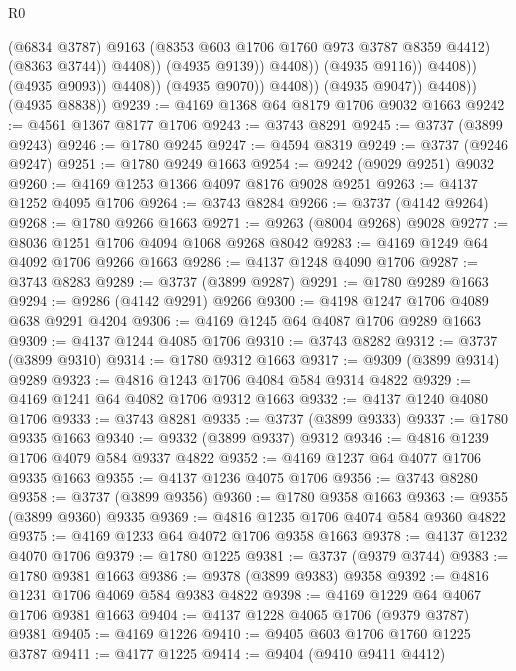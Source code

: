 \begin{lexlean}{R0}
\begin{coremodule}
                                          (@6834 @3787)
                                          @9163
                                          (@8353 @603 @1706 @1760 @973 @3787 @8359 @4412)
                                          (@8363 @3744))
                                        @4408))
                                    (@4935 @9139))
                                  @4408))
                              (@4935 @9116))
                            @4408))
                        (@4935 @9093))
                      @4408))
                  (@4935 @9070))
                @4408))
            (@4935 @9047))
          @4408))
      (@4935 @8838))
@9239 := @4169 @1368 @64 @8179 @1706 @9032 @1663
@9242 := @4561 @1367 @8177 @1706
@9243 := @3743 @8291
@9245 := @3737 (@3899 @9243)
@9246 := @1780 @9245
@9247 := @4594 @8319
@9249 := @3737 (@9246 @9247)
@9251 := @1780 @9249 @1663
@9254 := @9242 (@9029 @9251) @9032
@9260 := @4169 @1253 @1366 @4097 @8176 @9028 @9251
@9263 := @4137 @1252 @4095 @1706
@9264 := @3743 @8284
@9266 := @3737 (@4142 @9264)
@9268 := @1780 @9266 @1663
@9271 := @9263 (@8004 @9268) @9028
@9277 := @8036 @1251 @1706 @4094 @1068 @9268 @8042
@9283 := @4169 @1249 @64 @4092 @1706 @9266 @1663
@9286 := @4137 @1248 @4090 @1706
@9287 := @3743 @8283
@9289 := @3737 (@3899 @9287)
@9291 := @1780 @9289 @1663
@9294 := @9286 (@4142 @9291) @9266
@9300 := @4198 @1247 @1706 @4089 @638 @9291 @4204
@9306 := @4169 @1245 @64 @4087 @1706 @9289 @1663
@9309 := @4137 @1244 @4085 @1706
@9310 := @3743 @8282
@9312 := @3737 (@3899 @9310)
@9314 := @1780 @9312 @1663
@9317 := @9309 (@3899 @9314) @9289
@9323 := @4816 @1243 @1706 @4084 @584 @9314 @4822
@9329 := @4169 @1241 @64 @4082 @1706 @9312 @1663
@9332 := @4137 @1240 @4080 @1706
@9333 := @3743 @8281
@9335 := @3737 (@3899 @9333)
@9337 := @1780 @9335 @1663
@9340 := @9332 (@3899 @9337) @9312
@9346 := @4816 @1239 @1706 @4079 @584 @9337 @4822
@9352 := @4169 @1237 @64 @4077 @1706 @9335 @1663
@9355 := @4137 @1236 @4075 @1706
@9356 := @3743 @8280
@9358 := @3737 (@3899 @9356)
@9360 := @1780 @9358 @1663
@9363 := @9355 (@3899 @9360) @9335
@9369 := @4816 @1235 @1706 @4074 @584 @9360 @4822
@9375 := @4169 @1233 @64 @4072 @1706 @9358 @1663
@9378 := @4137 @1232 @4070 @1706
@9379 := @1780 @1225
@9381 := @3737 (@9379 @3744)
@9383 := @1780 @9381 @1663
@9386 := @9378 (@3899 @9383) @9358
@9392 := @4816 @1231 @1706 @4069 @584 @9383 @4822
@9398 := @4169 @1229 @64 @4067 @1706 @9381 @1663
@9404 := @4137 @1228 @4065 @1706 (@9379 @3787) @9381
@9405 := @4169 @1226
@9410 := @9405 @603 @1706 @1760 @1225 @3787
@9411 := @4177 @1225
@9414 := @9404 (@9410 @9411 @4412)

\end{coremodule}
\end{lexlean}
